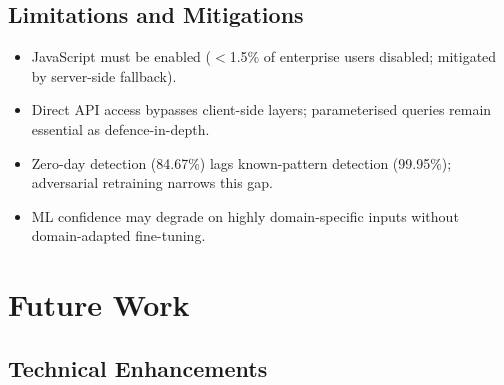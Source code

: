 \documentclass[10pt,twocolumn]{article}
\begin{document}
\subsection{Limitations and Mitigations}

\begin{itemize}[leftmargin=*,itemsep=1pt,topsep=2pt]
  \item JavaScript must be enabled ($<$1.5\% of enterprise users
        disabled; mitigated by server-side fallback).
  \item Direct API access bypasses client-side layers; parameterised
        queries remain essential as defence-in-depth.
  \item Zero-day detection (84.67\%) lags known-pattern detection
        (99.95\%); adversarial retraining narrows this gap.
  \item ML confidence may degrade on highly domain-specific inputs
        without domain-adapted fine-tuning.
\end{itemize}

\section{Future Work}
\label{sec:future}

\subsection{Technical Enhancements}
\end{document}
